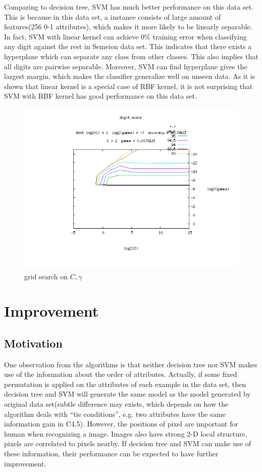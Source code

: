 \documentclass[a4paper,11pt]{nurop}
\begin{document}
Comparing to decision tree, SVM has much better performance on this data set. This is because in this data set, a instance consists of large amount of features(256 0-1 attributes), which makes it more likely to be linearly separable. In fact, SVM with linear kernel can achieve 0\% training error when classifying any digit against the rest in Semeion data set. This indicates that there exists a hyperplane which can separate any class from other classes. This also implies that all digits are pairwise separable. Moreover, SVM can find hyperplane gives the largest margin, which makes the classifier generalize well on unseen data. As it is shown that linear kernel is a special case of RBF kernel\cite{ssk,ll}, it is not surprising that SVM with RBF kernel has good performance on this data set.

\begin{figure}
\centering
\includegraphics[width=1.0\textwidth]{digit}
\caption{grid search on $C,\gamma$}
\end{figure}

\section{Improvement}
\subsection{Motivation}
One observation from the algorithms is that neither decision tree nor SVM makes use of the information about the order of attributes. Actually, if some fixed permutation is applied on the attributes of each example in the data set, then decision tree and SVM will generate the same model as the model generated by original data set(subtle difference may exists, which depends on how the algorithm deals with ``tie conditions'', e.g. two attributes have the same information gain in C4.5). However, the positions of pixel are important for human when recognizing a image. Images also have strong 2-D local structure, pixels are correlated to pixels nearby\cite{lecun98}. If decision tree and SVM can make use of these information, their performance can be expected to have further improvement.\\
\end{document}
